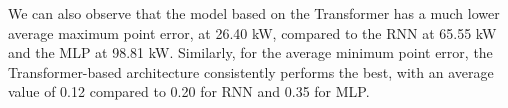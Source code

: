 We can also observe that the model based on the Transformer has a much lower average maximum point error, at 26.40 kW, compared to the RNN at 65.55 kW and the MLP at 98.81 kW. Similarly, for the average minimum point error, the Transformer-based architecture consistently performs the best, with an average value of 0.12 compared to 0.20 for RNN and 0.35 for MLP.
%
%


